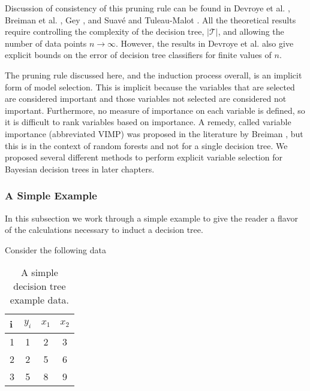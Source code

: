 Discussion of consistency of this pruning rule can be found in Devroye et al. \cite{devroye1996probabilistic}, Breiman et al. \cite{breiman1984classification}, Gey \cite{gey2005model}, and Suav\'{e} and Tuleau-Malot \cite{sauve2011variable}. All the theoretical results require controlling the complexity of the decision tree, $\vert\mathcal{T}\vert$, and allowing the number of data points $n\to\infty$. However, the results in Devroye et al. \cite{devroye1996probabilistic} also give explicit bounds on the error of decision tree classifiers for finite values of $n$. 

The pruning rule discussed here, and the induction process overall, is an implicit form of model selection. This is implicit because the variables that are selected are considered important and those variables not selected are considered not important. Furthermore, no measure of importance on each variable is defined, so it is difficult to rank variables based on importance. A remedy, called variable importance (abbreviated VIMP) was proposed in the literature by Breiman \cite{breiman2001random}, but this is in the context of random forests and not for a single decision tree. We proposed several different methods to perform explicit variable selection for Bayesian decision trees in later chapters.   

\subsubsection{A Simple Example}

In this subsection we work through a simple example to give the reader a flavor of the calculations necessary to induct a decision tree. 

Consider the following data 

\begin{table}[H]
\begin{center}
\begin{tabular}{ l | c | c | c }
  i& $y_i$ & $x_1$ & $x_2$\\
  \hline
  1&1 & 2 & 3 \\
  2&2 & 5 & 6 \\
  3&5 & 8 & 9 \\
\end{tabular}
\caption[A simple decision tree example data]{A simple decision tree example data.}
\label{fig:dtree_firststep}
\end{center}
\end{table}

